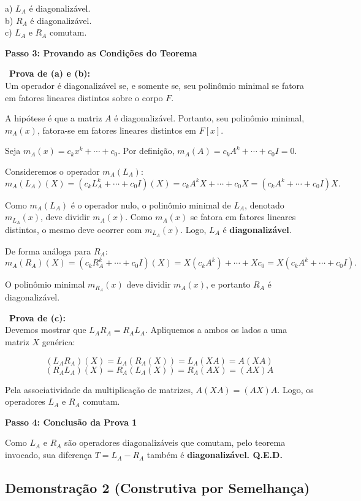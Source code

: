 a) $L_A$ é diagonalizável. \\
b) $R_A$ é diagonalizável. \\
c) $L_A$ e $R_A$ comutam.

\textbf{Passo 3: Provando as Condições do Teorema}

\textbullet\ \textbf{Prova de (a) e (b):} \\
Um operador é diagonalizável se, e somente se, seu polinômio minimal se fatora em fatores
lineares distintos sobre o corpo $F$.

A hipótese é que a matriz $A$ é diagonalizável. Portanto, seu polinômio minimal, $m_A(x)$, fatora-se
em fatores lineares distintos em $F[x]$.

Seja $m_A(x) = c_k x^k + \cdots + c_0$. Por definição, $m_A(A) = c_k A^k + \cdots + c_0 I = 0$.

Consideremos o operador $m_A(L_A)$:
\[
m_A(L_A)(X) = (c_k L_A^k + \cdots + c_0 I)(X) = c_k A^k X + \cdots + c_0 X = (c_k A^k + \cdots + c_0 I)X.
\]

Como $m_A(L_A)$ é o operador nulo, o polinômio minimal de $L_A$, denotado $m_{L_A}(x)$, deve dividir
$m_A(x)$. Como $m_A(x)$ se fatora em fatores lineares distintos, o mesmo deve ocorrer com
$m_{L_A}(x)$. Logo, $L_A$ é \textbf{diagonalizável}.

De forma análoga para $R_A$:
\[
m_A(R_A)(X) = (c_k R_A^k + \cdots + c_0 I)(X) = X(c_k A^k) + \cdots + X c_0 = X(c_k A^k + \cdots + c_0 I).
\]

O polinômio minimal $m_{R_A}(x)$ deve dividir $m_A(x)$, e portanto $R_A$ é diagonalizável.

\textbullet\ \textbf{Prova de (c):} \\
Devemos mostrar que $L_A R_A = R_A L_A$. Apliquemos a ambos os lados a uma matriz $X$ genérica:

\[
(L_A R_A)(X) = L_A(R_A(X)) = L_A(XA) = A(XA)
\]
\[
(R_A L_A)(X) = R_A(L_A(X)) = R_A(AX) = (AX)A
\]

Pela associatividade da multiplicação de matrizes, $A(XA) = (AX)A$. Logo, os operadores
$L_A$ e $R_A$ comutam.

\textbf{Passo 4: Conclusão da Prova 1}

Como $L_A$ e $R_A$ são operadores diagonalizáveis que comutam, pelo teorema invocado, sua diferença
$T = L_A - R_A$ também é \textbf{diagonalizável. Q.E.D.}

\subsection*{Demonstração 2 (Construtiva por Semelhança)}

